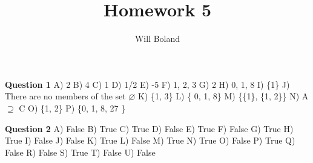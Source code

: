 \documentclass{article}
\begin{document}
\title{Homework 5}
\author{Will Boland}
\maketitle

\textbf{Question 1}\newline
A)	2\newline
B)	4\newline
C)	1\newline
D)	1/2\newline
E)	-5\newline
F)	1, 2, 3\newline
G)	2\newline
H)	0, 1, 8\newline
I)	\{1\}\newline
J)	There are no members of the set $\varnothing$\newline
K)	\{1, 3\}\newline
L)	\{ 0, 1, 8\}\newline
M)	\{\{1\}, \{1, 2\}\}\newline
N) 	A $\supseteq$ C\newline
O) 	\{1, 2\}\newline
P)	\{0, 1, 8, 27 \}\newline\newline

\textbf{Question 2}\newline
A)	False\newline
B)	True\newline
C)	True\newline
D)	False\newline
E)	True\newline
F)	False\newline
G)	True\newline
H)	True\newline
I)	False\newline
J)	False\newline
K)	True\newline
L)	False\newline
M)	True\newline
N)	True\newline
O)	False\newline
P)	True\newline
Q)	False\newline
R)	False\newline
S)	True\newline
T)	False\newline
U)	False	\newline\newline
\end{document}
